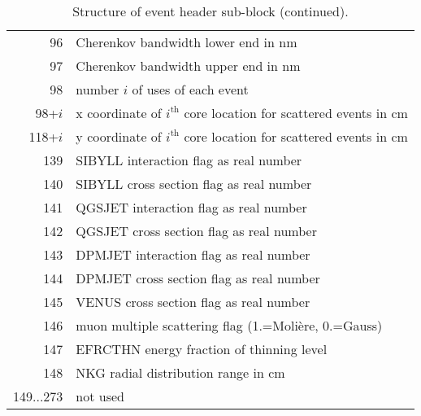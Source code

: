 {\begin{table}[p]
\begin{center}
\begin{tabular}{|r|l|}
96 &Cherenkov bandwidth lower end in nm \\
97 &Cherenkov bandwidth upper end in nm \\
98 &number $i$ of uses of each event \\
98+$i$& x coordinate of $i^{\mathrm{th}}$ core location for scattered events in cm \\
118+$i$& y coordinate of $i^{\mathrm{th}}$ core location for scattered events in cm\\
139 &SIBYLL interaction flag as real number \\
140 &SIBYLL cross section flag as real number \\
141 &QGSJET interaction flag as real number \\
142 &QGSJET cross section flag as real number \\
143 &DPMJET interaction flag as real number \\
144 &DPMJET cross section flag as real number \\
145 &VENUS cross section flag as real number \\
146 &muon multiple scattering flag (1.=Moli{\`e}re, 0.=Gauss) \\
147 &EFRCTHN energy fraction of thinning level \\
148 &NKG radial distribution range in cm \\
149...273 &not used\\
\hline
    \end{tabular}
  \end{center}
  \caption{Structure of event header sub-block (continued).}
  \label{tab:eh2}
\end{table}
}

